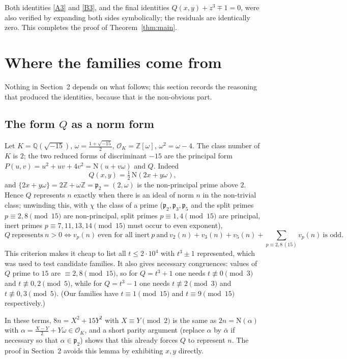 \documentclass[11pt]{article}
\theoremstyle{remark}
\newcommand{\Z}{\mathbb{Z}}
\newcommand{\Q}{\mathbb{Q}}
\newcommand{\N}{\mathrm{N}}
\newcommand{\OK}{\mathcal{O}_K}
\newcommand{\pp}{\mathfrak{p}}
\begin{document}
\medskip
Both identities \eqref{A3} and \eqref{B3}, and the final identities
$Q(x,y)+z^{3}\mp1=0$, were also verified by expanding both sides symbolically; the
residuals are identically zero. This completes the proof of Theorem~\ref{thm:main}.

\section{Where the families come from}

Nothing in Section~2 depends on what follows; this section records the reasoning
that produced the identities, because that is the non-obvious part.

\subsection{The form $Q$ as a norm form}
Let $K=\Q(\sqrt{-15})$, $\omega=\tfrac{1+\sqrt{-15}}{2}$, $\OK=\Z[\omega]$, $\omega^{2}=\omega-4$.
The class number of $K$ is $2$; the two reduced forms of discriminant $-15$ are the principal form
$P(u,v)=u^{2}+uv+4v^{2}=\N(u+v\omega)$ and $Q$. Indeed
\[
Q(x,y)=\tfrac12\,\N(2x+y\omega),
\]
and $\{2x+y\omega\}=2\Z+\omega\Z=\pp_{2}=(2,\omega)$ is the non-principal prime above $2$.
Hence $Q$ represents $n$ exactly when there is an ideal of norm $n$ in the non-trivial class;
unwinding this, with $\chi$ the class of a prime ($\pp_2,\pp_3,\pp_5$ and the split primes
$p\equiv2,8\pmod{15}$ are non-principal, split primes $p\equiv1,4\pmod{15}$ are principal,
inert primes $p\equiv7,11,13,14\pmod{15}$ must occur to even exponent),
\begin{equation}\label{eq:crit}
Q\ \text{represents}\ n>0\iff v_{p}(n)\ \text{even for all inert}\ p\ \text{and}\
v_{2}(n)+v_{3}(n)+v_{5}(n)+\!\!\sum_{p\equiv2,8\,(15)}\!\! v_{p}(n)\ \text{is odd}.
\end{equation}
This criterion makes it cheap to list all $t\le 2\cdot10^{4}$ with $t^{3}\pm1$ represented, which was
used to test candidate families. It also gives necessary congruences: values of $Q$ prime to $15$ are
$\equiv2,8\pmod{15}$, so for $Q=t^{3}+1$ one needs $t\not\equiv0\pmod 3$ and $t\not\equiv 0,2\pmod5$,
while for $Q=t^{3}-1$ one needs $t\not\equiv2\pmod3$ and $t\not\equiv0,3\pmod5$. (Our families have
$t\equiv1\pmod{15}$ and $t\equiv9\pmod{15}$ respectively.)

In these terms, $8n=X^{2}+15Y^{2}$ with $X\equiv Y\pmod 2$ is the same as $2n=\N(\alpha)$ with
$\alpha=\tfrac{X-Y}{2}+Y\omega\in\OK$, and a short parity argument (replace $\alpha$ by $\bar\alpha$
if necessary so that $\alpha\in\pp_{2}$) shows that this already forces $Q$ to represent $n$. The proof in
Section~2 avoids this lemma by exhibiting $x,y$ directly.
\end{document}
